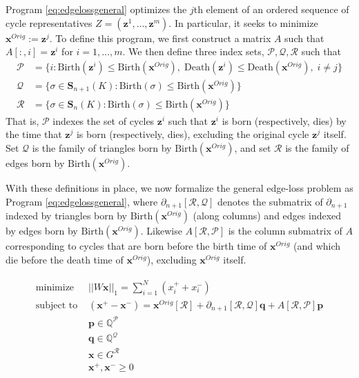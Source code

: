 \documentclass[11pt,onecolumn]{article}
\newcommand{\Q}{\mathbb{Q}}
\newcommand{\p}[0]{\mathbf{p}}
\newcommand{\q}[0]{\mathbf{q}}
\newcommand{\Simplices}[0]{\mathbf{S}}
\newcommand{\originalrep}{\mathbf{x}^{Orig}}
\newcommand{\optimalrep}{\mathbf{x}}
\newcommand{\cycle}{{\mathbf z}}
\newcommand{\birth}{\mathrm{Birth}}
\newcommand{\death}{\mathrm{Death}}
\newcommand{\goodcycleindices}{\mathcal P}
\newcommand{\goodtriangles}{\mathcal Q}
\newcommand{\goodedges}{\mathcal R}
\newcommand{\obasis}{Z} %
\newcommand{\obasisel}{\mathbf{z}}  %
\theoremstyle{plain}
\theoremstyle{definition}
\begin{document}
Program \eqref{eq:edgelossgeneral} optimizes the $j$th element of an ordered sequence of cycle representatives $\obasis = (\obasisel^1, \ldots, \obasisel^m)$.  In particular, it seeks to minimize $\originalrep := \cycle^j$.  To define this program, we first construct a matrix $A$ such that $A[:, i] = \cycle^i$ for $i = 1, \ldots, m$.  We then define  three index sets, $\goodcycleindices, \goodtriangles, \goodedges$ such that 
    \begin{align*}
        \goodcycleindices &= \{ i :  \birth(\cycle^i) \le \birth(\originalrep), \;  \death(\cycle^i) \le \death(\originalrep), \; i \neq j \} \\
        \goodtriangles &= \{\sigma \in \Simplices_{n+1}(K) : \birth(\sigma) \le \birth(\originalrep)\} 
        \\
        \goodedges &= \{\sigma \in \Simplices_n(K) : \birth(\sigma) \le \birth(\originalrep)\}
    \end{align*} 
That is, $\goodcycleindices$ indexes the set of cycles $\cycle^i$ such that $\cycle^i$ is born  (respectively, dies) by the time that $\cycle^j$ is born (respectively, dies),  excluding the original cycle $\cycle^j$ itself. Set $\goodtriangles$ is the family of triangles born by $\birth(\originalrep)$, and set $\goodedges$ is the family of edges born by $\birth(\originalrep)$. 

With these definitions in place, we now formalize the general edge-loss problem as Program \eqref{eq:edgelossgeneral}, where  $\partial_{n+1}[\goodedges,\goodtriangles]$ denotes the  submatrix of $\partial_{n+1}$ indexed by triangles born by $\birth(\originalrep)$ (along columns) and edges indexed by edges born by $\birth(\originalrep)$.  Likewise $A[ \goodedges ,\goodcycleindices]$ is the column submatrix of $A$ corresponding to cycles that are born  before the birth time of $\originalrep$ (and which die before the death time of $\originalrep$), excluding $\originalrep$ itself.

 
\begin{align}
\begin{split}
    \text{minimize   } & ||W \optimalrep ||_1 = \sum_{i=1}^N  (x^+_i + x_i^-)\\
   \text{subject to  } &  
      (\optimalrep^+ - \optimalrep^- )= \originalrep[\goodedges] +   \partial_{n+1}[\goodedges, \goodtriangles]  \q + A[\goodedges, \goodcycleindices] \p \\
      & \p \in \Q^{\goodcycleindices} \\
      & \q \in \Q^{\goodtriangles} \\      
      & \optimalrep \in G^{\goodedges } \\      
      & \optimalrep^+, \optimalrep^- \geq 0 
      \end{split}
      \label{eq:edgelossgeneral}
\end{align}
\end{document}
